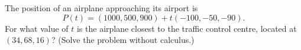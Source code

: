 The position of an airplane approaching its airport is
\[P(t)=(1000,500,900)+t(-100,-50,-90).\]
For what value of $t$ is the airplane closest to the traffic control centre, located at $(34,68,16)$? (Solve the problem without calculus.)
